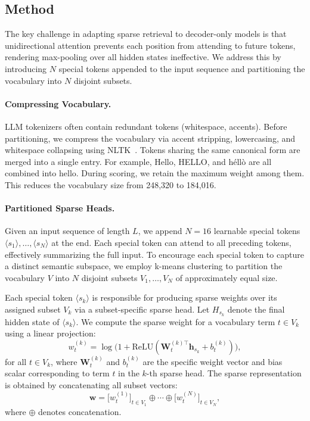 \subsection{\ours Method}
\label{sec:method}

The key challenge in adapting sparse retrieval to decoder-only models is that unidirectional attention prevents each position from attending to future tokens, rendering max-pooling over all hidden states ineffective.
We address this by introducing $N$ special tokens appended to the input sequence and partitioning the vocabulary into $N$ disjoint subsets.

\paragraph{Compressing Vocabulary.}
LLM tokenizers often contain redundant tokens (\eg whitespace, accents). Before partitioning, we compress the vocabulary via accent stripping, lowercasing, and whitespace collapsing using NLTK~\citep{nltk}. Tokens sharing the same canonical form are merged into a single entry. For example,  Hello, HELLO, and héllò are all combined into hello. During scoring, we retain the maximum weight among them. This reduces the vocabulary size from 248,320 to 184,016. 

\paragraph{Partitioned Sparse Heads.}
Given an input sequence of length $L$, we append $N{=}16$ learnable special tokens $\langle s_1 \rangle, \dots, \langle s_N \rangle$ at the end. Each special token can attend to all preceding tokens, effectively summarizing the full input. 
To encourage each special token to capture a distinct semantic subspace, we employ k-means clustering to partition the vocabulary $V$ into $N$ disjoint subsets $V_1, \dots, V_N$ of approximately equal size. 

Each special token $\langle s_k \rangle$ is responsible for producing sparse weights over its assigned subset $V_k$ via a subset-specific sparse head. 
Let $H_{s_k}$ denote the final hidden state of $\langle s_k \rangle$. We compute the sparse weight for a vocabulary term $t \in V_k$ using a linear projection:
\begin{equation}\label{eq:subspace-sparse}
w_{t}^{(k)} = \log\bigl(1 + \text{ReLU}(\bm{W}_{t}^{(k)\top} \bm{h}_{s_k} + b_{t}^{(k)})\bigr),
\end{equation}
for all $t \in V_k$, where $\bm{W}_{t}^{(k)}$ and $b_{t}^{(k)}$ are the specific weight vector and bias scalar corresponding to term $t$ in the $k$-th sparse head. The sparse representation is obtained by concatenating all subset vectors:
\begin{equation}\label{eq:concat-sparse}
\bm{w} = \bigl[w_{t}^{(1)}\bigr]_{t \in V_1} \oplus \cdots \oplus \bigl[w_{t}^{(N)}\bigr]_{t \in V_N},
\end{equation}
where $\oplus$ denotes concatenation. 

